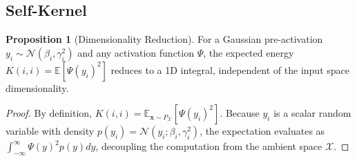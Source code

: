 \documentclass[11pt, a4paper, copyright, gdm]{google}
\newcommand{\xVect}{\boldsymbol{x}}
\newcommand{\calN}{\mathcal{N}}
\newcommand{\calX}{\mathcal{X}}
\newcommand{\E}{\mathbb{E}}
\theoremstyle{definition}
\newtheorem{proposition}[theorem]{Proposition}
\begin{document}
\subsection{Self-Kernel}

\begin{proposition}[Dimensionality Reduction]
\label{prop:decouple_weights}
For a Gaussian pre-activation $y_i \sim \calN(\beta_i, \gamma_i^2)$ and any activation function $\Psi$, the expected energy $K(i,i) = \E[\Psi(y_i)^2]$ reduces to a 1D integral, independent of the input space dimensionality.
\end{proposition}
\begin{proof}
By definition, $K(i,i) = \E_{\xVect \sim P_{\calX}} [\Psi(y_i)^2]$. Because $y_i$ is a scalar random variable with density $p(y_i) = \calN(y_i; \beta_i, \gamma_i^2)$, the expectation evaluates as $\int_{-\infty}^\infty \Psi(y)^2 p(y) dy$, decoupling the computation from the ambient space $\calX$.
\end{proof}
\end{document}
